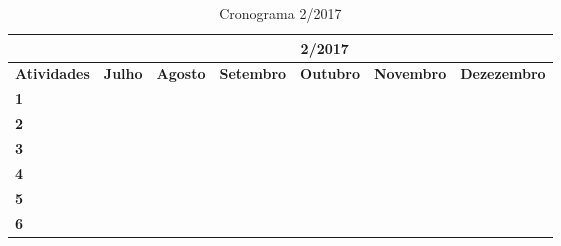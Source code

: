 \documentclass[a4paper,12pt]{article}
\begin{document}
\newpage
\begin{table}[H]
\centering
\caption{Cronograma 2/2017}
\label{my-label}
\begin{tabular}{|l|l|l|l|l|l|l|}
\hline
                    & \multicolumn{6}{c|}{\textbf{2/2017}}                                                                                                                                                                                            \\ \hline
\textbf{Atividades} & \textbf{Julho}                                  & \textbf{Agosto}          & \textbf{Setembro}                               & \textbf{Outubro}                                & \textbf{Novembro}        & \textbf{Dezezembro} \\ \hline
\textbf{1}          & \cellcolor[HTML]{000000}                        &                          &                                                 &                                                 &                          &                     \\ \hline
\textbf{2}          & \cellcolor[HTML]{000000}{\color[HTML]{333333} } & \cellcolor[HTML]{000000} &                                                \cellcolor[HTML]{000000} &    \cellcolor[HTML]{000000}               &       \cellcolor[HTML]{000000}                   &  \cellcolor[HTML]{000000}                   \\ \hline
\textbf{3}          &                                                 &  & \cellcolor[HTML]{000000}                        &                                                 &                          &                     \\ \hline
\textbf{4}          &                                                 &                          & \cellcolor[HTML]{000000}{\color[HTML]{000000} } & \cellcolor[HTML]{000000}{\color[HTML]{000000} } &                          &                     \\ \hline
\textbf{5}          &                                                 &                          &                         & \cellcolor[HTML]{000000}{\color[HTML]{000000} } &                          &                     \\ \hline
\textbf{6}          &                                                 &                          &                                                 &                         &       \cellcolor[HTML]{000000}                   &                     \\ \hline

\end{tabular}
\end{table}
		
\end{document}
